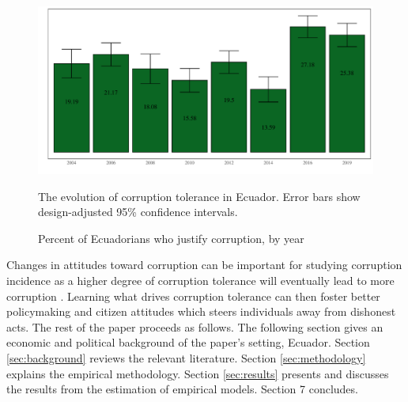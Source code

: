 \documentclass[12pt,a4]{article}
\makeatletter
\def\maxwidth{ %
  \ifdim\Gin@nat@width>\linewidth
    \linewidth
  \else
    \Gin@nat@width
  \fi
}
\newenvironment{knitrout}{}{} %
\makeatother
\begin{document}

\begin{figure}[htbp]
\begin{knitrout}
\color{fgcolor}

{\centering \includegraphics[width=\maxwidth]{figure/ctol_graph-1} 

}


\end{knitrout}
\caption{Percent of Ecuadorians who justify corruption, by year}
\label{fig:ctoly}
The evolution of corruption tolerance in Ecuador. Error bars show design-adjusted 95\% confidence intervals.
\end{figure}

Changes in attitudes toward corruption can be important for studying corruption incidence as a higher degree of corruption tolerance will eventually lead to more corruption \parencite{Campbell.2014, Ariely.2019}. Learning what drives corruption tolerance can then foster better policymaking and citizen attitudes which steers individuals away from dishonest acts. The rest of the paper proceeds as follows. The following section gives an economic and political background of the paper's setting, Ecuador. Section \ref{sec:background} reviews the relevant literature. Section \ref{sec:methodology} explains the empirical methodology. Section \ref{sec:results} presents and discusses the results from the estimation of empirical models. Section 7 concludes. 
\end{document}

